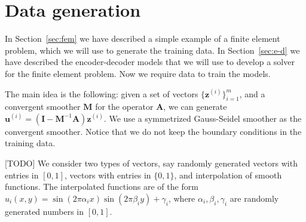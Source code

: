 \section{Data generation}

In Section~\ref{sec:fem} we have described a simple example of a finite element problem, which we will use to generate the training data.
In Section~\ref{sec:e-d} we have described the encoder-decoder models that we will use to develop a solver for the finite element problem.
Now we require data to train the models.

The main idea is the following: given a set of vectors \( \{ \mathbf{z}^{(i)} \}_{i=1}^{m} \), and a convergent smoother \( \mathbf{M}\) for the operator \(\mathbf{A}\), we can generate \( \mathbf{u}^{(i)} = (\mathbf{I} - \mathbf{M}^{-1} \mathbf{A}) \mathbf{z}^{(i)} \).
We use a symmetrized Gauss-Seidel smoother as the convergent smoother.
Notice that we do not keep the boundary conditions in the training data.

[TODO]
We consider two types of vectors, say randomly generated vectors with entries in \([0,1]\), vectors with entries in \(\{0,1\}\), and interpolation of smooth functions.
The interpolated functions are of the form \(u_i(x,y) = \sin(2 \pi \alpha_i x) \sin(2 \pi \beta_i y) + \gamma_i\), where \(\alpha_i, \beta_i, \gamma_i\) are randomly generated numbers in \([0,1]\).

